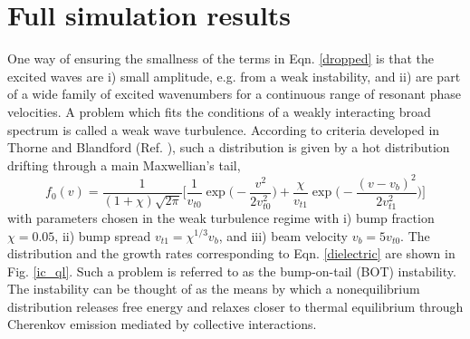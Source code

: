 \documentclass{article}
\begin{document}

\section{Full simulation results}\label{section}
One way of ensuring the smallness of the terms in Eqn. \ref{dropped} is that the excited waves are i) small amplitude, e.g. from a weak instability, and ii) are part of a wide family of excited wavenumbers for a continuous range of resonant phase velocities. A problem which fits the conditions of a weakly interacting broad spectrum is called a weak wave turbulence. According to criteria developed in Thorne and Blandford (Ref. \cite{thorne}), such a distribution is given by a hot distribution drifting through a main Maxwellian's tail,
\begin{equation}
  f_0(v) = \frac{1}{(1+\chi)\sqrt{2\pi}}\Bigg[\frac{1}{v_{t0}}\exp\Bigg(-\frac{v^2}{2v_{t0}^2}\Bigg) + \frac{\chi}{v_{t1}}\exp\Bigg(-\frac{(v-v_b)^2}{2v_{t1}^2}\Bigg)\Bigg]
\end{equation}
with parameters chosen in the weak turbulence regime with i) bump fraction $\chi = 0.05$, ii) bump spread $v_{t1} = \chi^{1/3}v_b$, and iii) beam velocity $v_b = 5v_{t0}$. The distribution and the growth rates corresponding to Eqn. \ref{dielectric} are shown in Fig. \ref{ic_ql}. Such a problem is referred to as the bump-on-tail (BOT) instability. The instability can be thought of as the means by which a nonequilibrium distribution releases free energy and relaxes closer to thermal equilibrium through Cherenkov emission mediated by collective interactions.
\end{document}
